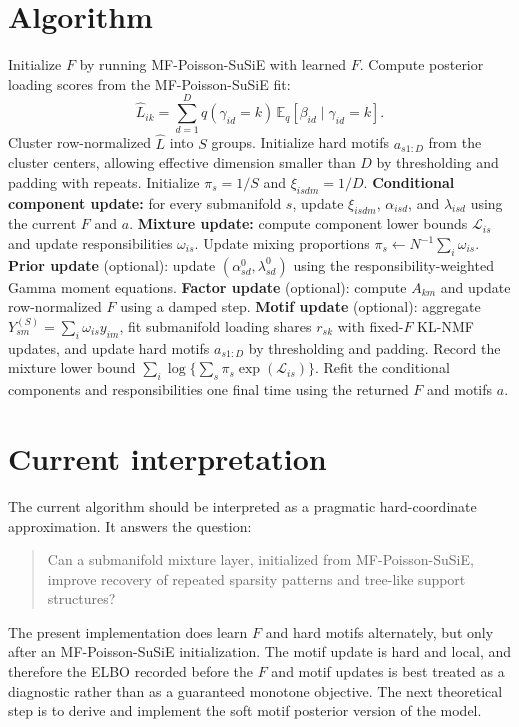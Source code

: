\documentclass[11pt]{article}
\newcommand{\E}{\mathbb{E}}
\theoremstyle{definition}
\begin{document}
\section{Algorithm}

\begin{algorithm}[H]
\caption{Alternating hard-motif MoS-Poisson-SuSiE}
\small
\begin{algorithmic}[1]
\State Initialize $F$ by running MF-Poisson-SuSiE with learned $F$.
\State Compute posterior loading scores from the MF-Poisson-SuSiE fit:
\[
  \widehat{L}_{ik}
  =
  \sum_{d=1}^{D}
  q(\gamma_{id}=k)\,
  \E_q[\beta_{id}\mid \gamma_{id}=k].
\]
\State Cluster row-normalized $\widehat{L}$ into $S$ groups.
\State Initialize hard motifs $a_{s1:D}$ from the cluster centers, allowing
  effective dimension smaller than $D$ by thresholding and padding with repeats.
\State Initialize $\pi_s=1/S$ and $\xi_{isdm}=1/D$.
  \State \textbf{Conditional component update:}
  for every submanifold $s$, update $\xi_{isdm}$, $\alpha_{isd}$, and
  $\lambda_{isd}$ using the current $F$ and $a$.
  \State \textbf{Mixture update:}
  compute component lower bounds $\mathcal{L}_{is}$ and update
  responsibilities $\omega_{is}$.
  \State Update mixing proportions
  $\pi_s \leftarrow N^{-1}\sum_i \omega_{is}$.
  \State \textbf{Prior update} (optional):
  update $(\alpha^0_{sd},\lambda^0_{sd})$ using the responsibility-weighted
  Gamma moment equations.
  \State \textbf{Factor update} (optional):
  compute $A_{km}$ and update row-normalized $F$ using a damped step.
  \State \textbf{Motif update} (optional):
  aggregate $Y^{(S)}_{sm}=\sum_i\omega_{is}y_{im}$, fit submanifold loading
  shares $r_{sk}$ with fixed-$F$ KL-NMF updates, and update hard motifs
  $a_{s1:D}$ by thresholding and padding.
  \State Record the mixture lower bound
  $\sum_i \log\{\sum_s \pi_s\exp(\mathcal{L}_{is})\}$.
\EndFor
\State Refit the conditional components and responsibilities one final time
using the returned $F$ and motifs $a$.
\end{algorithmic}
\end{algorithm}

\section{Current interpretation}

The current algorithm should be interpreted as a pragmatic hard-coordinate
approximation. It answers the question:

\begin{quote}
Can a submanifold mixture layer, initialized from MF-Poisson-SuSiE, improve
recovery of repeated sparsity patterns and tree-like support structures?
\end{quote}

The present implementation does learn $F$ and hard motifs alternately, but only
after an MF-Poisson-SuSiE initialization. The motif update is hard and local,
and therefore the ELBO recorded before the $F$ and motif updates is best treated
as a diagnostic rather than as a guaranteed monotone objective. The next
theoretical step is to derive and implement the soft motif posterior version of
the model.
\end{document}
